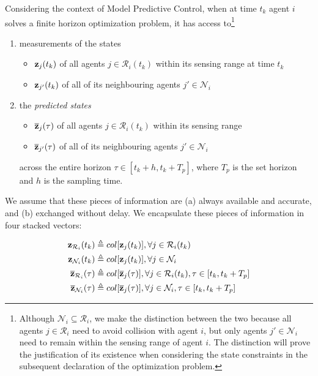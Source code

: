 \begin{gg_box}
\begin{assumption}
Considering the context of Model Predictive Control, when
at time $t_k$ agent $i$ solves a finite horizon optimization problem, it has
access to\footnote{Although
    $\mathcal{N}_i \subseteq \mathcal{R}_i$, we make the distinction between
    the two because all agents $j \in \mathcal{R}_i$ need to avoid collision
    with agent $i$, but only agents $j' \in \mathcal{N}_i$ need to remain
    within the sensing range of agent $i$. The distinction will prove the
    justification of its existence when considering the state constraints
    in the subsequent declaration of the optimization problem.}

\begin{enumerate}
  \item measurements of the states
    \begin{itemize}
      \item $\bm{\mathbf{z}}_j(t_k)$ of all agents $j \in \mathcal{R}_i(t_k)$ within its sensing range at time $t_k$
      \item $\bm{\mathbf{z}}_{j'}(t_k)$ of all of its neighbouring agents $j' \in \mathcal{N}_i$
      \end{itemize}
    \item the \textit{predicted states}
      \begin{itemize}
        \item $\overline{\bm{\mathbf{z}}}_j(\tau)$ of all agents $j \in \mathcal{R}_i(t_k)$ within its sensing range
        \item $\overline{\bm{\mathbf{z}}}_{j'}(\tau)$ of all of its neighbouring agents $j' \in \mathcal{N}_i$
      \end{itemize}
      across the entire horizon $\tau \in [t_k + h, t_k + T_p]$, where $T_p$ is the
      set horizon and $h$ is the sampling time.
\end{enumerate}
\end{assumption}
\end{gg_box}
We assume that these pieces of information are (a) always available and
accurate, and (b) exchanged without delay. We encapsulate these pieces of
information in four stacked vectors:

\begin{subequations}
\begin{align}
  \bm{\mathbf{z}}_{\mathcal{R}_i}(t_k) &\triangleq col[\bm{\mathbf{z}}_j(t_k)], \forall j \in \mathcal{R}_i(t_k) \\
  \bm{\mathbf{z}}_{\mathcal{N}_i}(t_k) &\triangleq col[\bm{\mathbf{z}}_j(t_k)], \forall j \in \mathcal{N}_i \\
  \overline{\bm{\mathbf{z}}}_{\mathcal{R}_i}(\tau) &\triangleq col[\overline{\bm{\mathbf{z}}}_j(\tau)], \forall j \in \mathcal{R}_i(t_k), \tau \in [t_k, t_k + T_p] \\
  \overline{\bm{\mathbf{z}}}_{\mathcal{N}_i}(\tau) &\triangleq col[\overline{\bm{\mathbf{z}}}_j(\tau)], \forall j \in \mathcal{N}_i, \tau \in [t_k, t_k + T_p]
\end{align}
\end{subequations}

